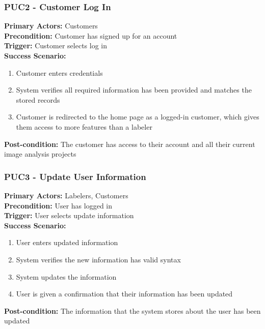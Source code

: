 \documentclass[12pt]{article}
\begin{document}
\subsubsection*{PUC2 - Customer Log In}
\label{sec:PUC2}
\textbf{Primary Actors:} Customers\\ 
\textbf{Precondition:} Customer has signed up for an account\\
\textbf{Trigger:} Customer selects log in\\
\textbf{Success Scenario:}
\begin{enumerate}
    \item Customer enters credentials
    \item System verifies all required information has been provided and matches the stored records
    \item Customer is redirected to the home page as a logged-in customer, which gives them access to more features than a labeler
\end{enumerate}
\textbf{Post-condition:} The customer has access to their account and all their current image analysis projects

\subsubsection*{PUC3 - Update User Information}
\label{sec:PUC3}
\textbf{Primary Actors:} Labelers, Customers\\ 
\textbf{Precondition:} User has logged in\\
\textbf{Trigger:} User selects update information\\
\textbf{Success Scenario:}
\begin{enumerate}
    \item User enters updated information
    \item System verifies the new information has valid syntax
    \item System updates the information
    \item User is given a confirmation that their information has been updated
\end{enumerate}
\textbf{Post-condition:} The information that the system stores about the user has been updated
\end{document}
